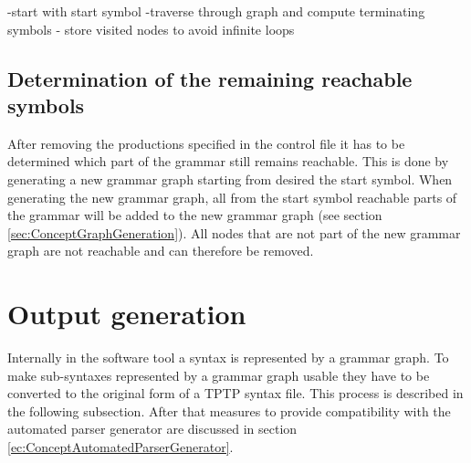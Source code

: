 -start with start symbol
-traverse through graph and compute terminating symbols
- store visited nodes to avoid infinite loops

\subsection{Determination of the remaining reachable symbols}\label{sec:ConceptDerterminingRemainingReachable}
After removing the productions specified in the control file it has to be determined which part of the grammar still remains reachable.
This is done by generating a new grammar graph starting from desired the start symbol.
When generating the new grammar graph, all from the start symbol reachable parts of the grammar will be added to the new grammar graph (see section \ref{sec:ConceptGraphGeneration}).
All nodes that are not part of the new grammar graph are not reachable and can therefore be removed.

\section{Output generation}\label{sec:ConceptOutputGeneration}
Internally in the software tool a syntax is represented by a grammar graph.
To make sub-syntaxes represented by a grammar graph usable they have to be converted to the original form of a \ac{TPTP} syntax file. This process is described in the following subsection.
After that measures to provide compatibility with the automated parser generator are discussed in section \ref{ec:ConceptAutomatedParserGenerator}.

